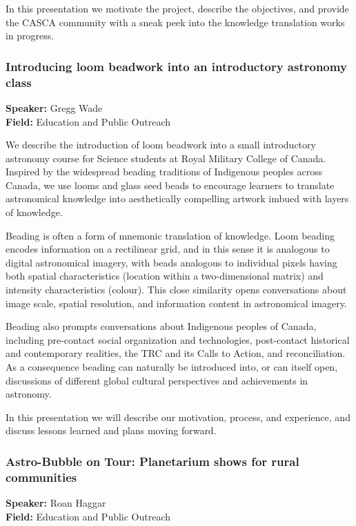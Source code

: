 In this presentation we motivate the project, describe the objectives, and provide the CASCA community with a sneak peek into the knowledge translation works in progress.

\hypertarget{abstract-talk-11}{}\label{abstract-page-talk-11}
\subsubsection*{Introducing loom beadwork into an introductory astronomy class}
\textbf{Speaker:} Gregg Wade\\
\textbf{Field:} Education and Public Outreach

We describe the introduction of loom beadwork into a small introductory astronomy course for Science students at Royal Military College of Canada. Inspired by the widespread beading traditions of Indigenous peoples across Canada, we use looms and glass seed beads to encourage learners to translate astronomical knowledge into aesthetically compelling artwork imbued with layers of knowledge.

Beading is often a form of mnemonic translation of knowledge. Loom beading encodes information on a rectilinear grid, and in this sense it is analogous to digital astronomical imagery, with beads analogous to individual pixels having both spatial characteristics (location within a two-dimensional matrix) and intensity characteristics (colour). This close similarity opens conversations about image scale, spatial resolution, and information content in astronomical imagery.

Beading also prompts conversations about Indigenous peoples of Canada, including pre-contact social organization and technologies, post-contact historical and contemporary realities, the TRC and its Calls to Action, and reconciliation. As a consequence beading can naturally be introduced into, or can itself open, discussions of different global cultural perspectives and achievements in astronomy.

In this presentation we will describe our motivation, process, and experience, and discuss lessons learned and plans moving forward.

\hypertarget{abstract-talk-211}{}\label{abstract-page-talk-211}
\subsubsection*{Astro-Bubble on Tour: Planetarium shows for rural communities}
\textbf{Speaker:} Roan Haggar\\
\textbf{Field:} Education and Public Outreach

